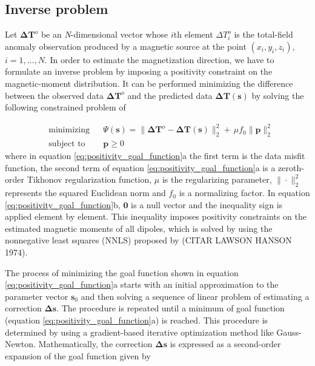 \subsection{Inverse problem}

Let $\mathbf{\Delta T}^o$ be an \textit{N}-dimensional vector whose $i$th element $\Delta T_i^o$ is the total-field anomaly observation produced by a magnetic source at the point $(x_i,y_i,z_i)$, $i = 1, \ldots, N$. In order to estimate the magnetization direction, we have to formulate an inverse problem by imposing a positivity constraint on the magnetic-moment distribution. It can be performed minimizing the difference between the observed data $\mathbf{\Delta T}^o$ and the predicted data $\mathbf{\Delta T} (\mathbf{s})$ by solving the following constrained problem of

\begin{subequations}
\begin{align}
& \text{minimizing}
& &\Psi(\mathbf{s}) =\lVert \mathbf{\Delta T}^o - \mathbf{\Delta T} (\mathbf{s}) \rVert_{2}^{2} + \, \mu f_0 \parallel \mathbf{p} \parallel_{2}^{2} \\
& \text{subject to}
& & \mathbf{p} \geqslant 0
\end{align}
\label{eq:positivity_goal_function}
\end{subequations}
where in equation \ref{eq:positivity_goal_function}a the first term is the data misfit function, the second term of equation \ref{eq:positivity_goal_function}a is a zeroth-order Tikhonov regularization function, $\mu$ is the regularizing parameter, $\| \cdot \|_{2}^{2}$ represents the squared Euclidean norm and $f_0$ is a normalizing factor. In equation \ref{eq:positivity_goal_function}b, $\mathbf{0}$ is a null vector and the inequality sign is applied element by element. This inequality imposes positivity constraints on the estimated magnetic moments of all dipoles, which is solved by using the nonnegative least squares (NNLS) proposed by (CITAR LAWSON HANSON 1974). 

The process of minimizing the goal function shown in equation \ref{eq:positivity_goal_function}a starts with an initial approximation to the parameter vector $\mathbf{s}_0$ and then solving a sequence of linear problem of estimating a correction $\mathbf{\Delta s}$. The procedure is repeated until a minimum of goal function (equation \ref{eq:positivity_goal_function}a) is reached. This procedure is determined by using a gradient-based iterative optimization method like Gauss-Newton. Mathematically, the correction $\mathbf{\Delta s}$ is expressed as a second-order expansion of the goal function given by     

